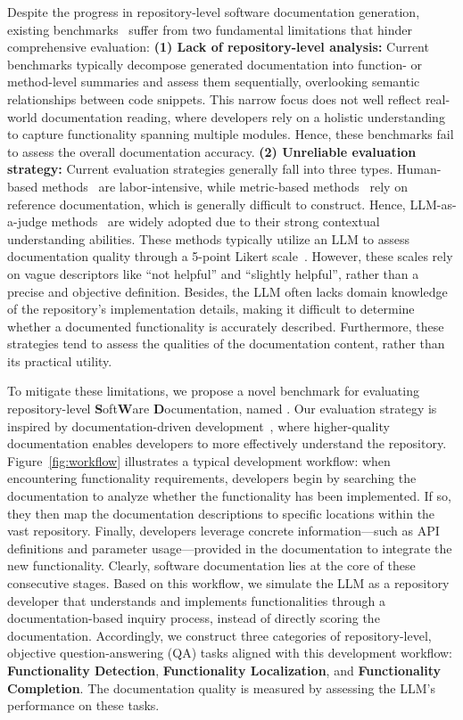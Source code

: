 Despite the progress in repository-level software documentation generation, existing benchmarks~\cite{repoagent, docagent, hierarchical} suffer from two fundamental limitations that hinder comprehensive evaluation: \textbf{(1) Lack of repository-level analysis:} Current benchmarks typically decompose generated documentation into function- or method-level summaries and assess them sequentially, overlooking semantic relationships between code snippets. This narrow focus does not well reflect real-world documentation reading, where developers rely on a holistic understanding to capture functionality spanning multiple modules. Hence, these benchmarks fail to assess the overall documentation accuracy. \textbf{(2) Unreliable evaluation strategy:} Current evaluation strategies generally fall into three types. Human-based methods~\cite{human1, human2} are labor-intensive, while metric-based methods~\cite{bleu,meteor,rouge} rely on reference documentation, which is generally difficult to construct. Hence, LLM-as-a-judge methods~\cite{docagent, hierarchical} are widely adopted due to their strong contextual understanding abilities. These methods typically utilize an LLM to assess documentation quality through a 5-point Likert scale~\cite{likert}. However, these scales rely on vague descriptors like ``not helpful'' and ``slightly helpful'', rather than a precise and objective definition. Besides, the LLM often lacks domain knowledge of the repository's implementation details, making it difficult to determine whether a documented functionality is accurately described. Furthermore, these strategies tend to assess the qualities of the documentation content, rather than its practical utility.

To mitigate these limitations, we propose a novel benchmark for evaluating repository-level \textbf{S}oft\textbf{W}are \textbf{D}ocumentation, named \textbf{\benchmark}. Our evaluation strategy is inspired by documentation-driven development~\cite{1377190, heeager2012introducing, survey2}, where higher-quality documentation enables developers to more effectively understand the repository. Figure~\ref{fig:workflow} illustrates a typical development workflow: when encountering functionality requirements, developers begin by searching the documentation to analyze whether the functionality has been implemented. If so, they then map the documentation descriptions to specific locations within the vast repository. Finally, developers leverage concrete information—such as API definitions and parameter usage—provided in the documentation to integrate the new functionality. Clearly, software documentation lies at the core of these consecutive stages. Based on this workflow, we simulate the LLM as a repository developer that understands and implements functionalities through a documentation-based inquiry process, instead of directly scoring the documentation. Accordingly, we construct three categories of repository-level, objective question-answering (QA) tasks aligned with this development workflow: \textbf{Functionality Detection}, \textbf{Functionality Localization}, and \textbf{Functionality Completion}. The documentation quality is measured by assessing the LLM's performance on these tasks. 

